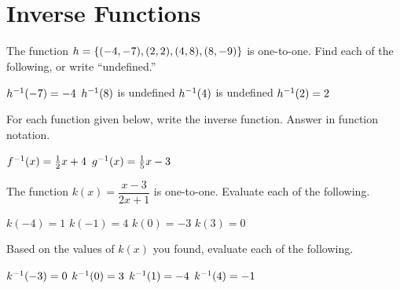 \section*{Inverse Functions}
The function $h=\left\{(-4,-7),(2,2),(4,8),(8,-9)\right\}$ is one-to-one. Find each of the following, or write ``undefined.''
\begin{smenum}
\mitemxxxx
{$h^{-1}(-7)=-4$}
{$h^{-1}(8)$ is undefined}
{$h^{-1}(4)$ is undefined}
{$h^{-1}(2)=2$}
\end{smenum}
For each function given below, write the inverse function. Answer in function notation.
\begin{smenum}
\mitemxx
{$f^{-1}(x)=\frac{1}{2}x+4$}
{$g^{-1}(x)=\frac{1}{5}x-3$}
\end{smenum}
The function $k(x)=\dfrac{x-3}{2x+1}$ is one-to-one. Evaluate each of the following.
\begin{smenum}
\mitemxxxx
{$k(-4)=1$}
{$k(-1)=4$}
{$k(0)=-3$}
{$k(3)=0$}
\end{smenum}
Based on the values of $k(x)$ you found, evaluate each of the following.
\begin{smenum}
\mitemxxxx
{$k^{-1}(-3)=0$}
{$k^{-1}(0)=3$}
{$k^{-1}(1)=-4$}
{$k^{-1}(4)=-1$}
\end{smenum}

